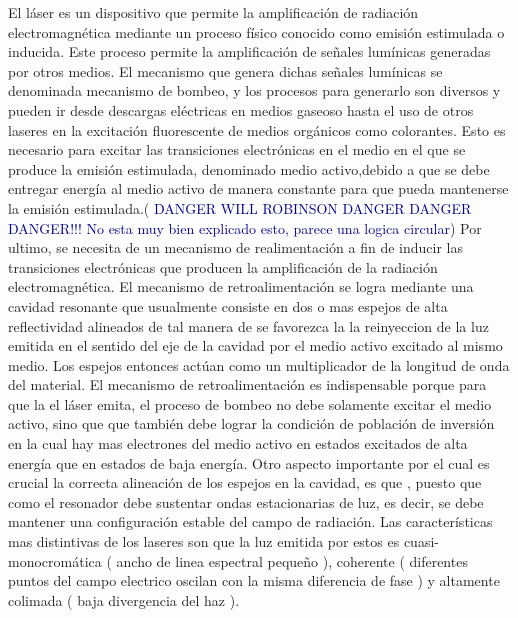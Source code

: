 \documentclass[10pt, a4paper]{article}%
\begin{document}
\begin{multicols}{2}
\iffalse
El láser es un dispositivo que permite la amplificación de radiación electromagnética mediante un proceso físico conocido como emisión estimulada o inducida. Este proceso permite la amplificación de señales lumínicas generadas por otros medios. El mecanismo que genera dichas señales lumínicas se denominada mecanismo de bombeo, y los procesos para generarlo son diversos y pueden ir desde descargas eléctricas en medios gaseoso hasta el uso de otros laseres en la excitación fluorescente de medios orgánicos como colorantes. Esto es necesario para excitar las transiciones electrónicas en el medio en el que se produce la emisión estimulada, denominado medio activo,debido a que se debe entregar energía al medio activo de manera constante para que pueda mantenerse la emisión estimulada.(\textcolor{DarkBlue}{ DANGER WILL ROBINSON DANGER DANGER DANGER!!! No esta muy bien explicado esto, parece una logica circular}) Por ultimo, se necesita de un mecanismo de realimentación a fin de inducir las transiciones electrónicas que producen la amplificación de la radiación electromagnética. El mecanismo de retroalimentación se logra mediante una cavidad resonante que usualmente consiste en dos o mas espejos de alta reflectividad alineados de tal manera de se favorezca la la reinyeccion de la luz emitida en el sentido del eje de la cavidad por el medio activo excitado al mismo medio. Los espejos entonces actúan como un multiplicador de la longitud de onda del material. El mecanismo de retroalimentación es indispensable porque para que la el láser emita, el proceso de bombeo no debe solamente excitar el medio activo, sino que que también debe lograr la condición de población de inversión en la cual hay mas electrones del medio activo en estados excitados de alta energía que en estados de baja energía.
Otro aspecto importante por el cual es crucial la correcta alineación de los espejos en la cavidad, es que , puesto que como el resonador debe sustentar ondas estacionarias de luz, es decir, se debe mantener una configuración estable del campo de radiación.
\newline
Las características mas distintivas de los laseres son que la luz emitida por estos es cuasi-monocromática ( ancho de linea espectral pequeño ), coherente ( diferentes puntos del campo electrico oscilan con la misma diferencia de fase ) y altamente colimada ( baja divergencia del haz ).


\end{multicols}
\end{document}
